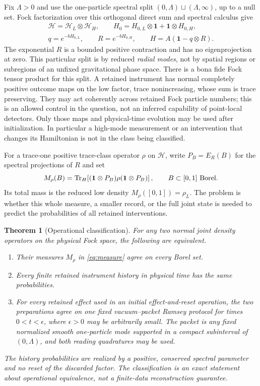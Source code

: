 \documentclass[11pt]{article}
\newtheorem{theorem}{Theorem}
\newcommand{\cH}{\mathcal H}
\newcommand{\tr}{\operatorname{Tr}}
\newcommand{\one}{\mathbf 1}
\begin{document}
Fix \(\Lambda>0\) and use the one-particle spectral split \((0,\Lambda)\sqcup(\Lambda,\infty)\), up to a null set. Fock factorization over this orthogonal direct sum and spectral calculus give
\begin{gather}
  \cH=\cH_L\otimes\cH_H,\qquad
  H_0=H_{0,L}\otimes\one+\one\otimes H_{0,H},\nonumber\\
  q=e^{-bH_{0,L}},\qquad R=e^{-bH_{0,H}},\qquad
  H=A(\one-q\otimes R).
  \label{eq:physical}
\end{gather}
The exponential \(R\) is a bounded positive contraction and has no eigenprojection at zero. This particular split is by reduced \emph{radial modes}, not by spatial regions or subregions of an unfixed gravitational phase space. There is a bona fide Fock tensor product for this split. A retained instrument has normal completely positive outcome maps on the low factor, trace nonincreasing, whose sum is trace preserving. They may act coherently across retained Fock particle numbers; this is an allowed control in the question, not an inferred capability of point-local detectors. Only those maps and physical-time evolution may be used after initialization. In particular a high-mode measurement or an intervention that changes its Hamiltonian is not in the class being classified.

For a trace-one positive trace-class operator \(\rho\) on \(\cH\), write \(P_B=E_R(B)\) for the spectral projections of \(R\) and set
\begin{equation}
 M_\rho(B)=\tr_H\!\left[(\one\otimes P_B)\rho(\one\otimes P_B)\right],
 \qquad B\subset[0,1]\ \hbox{Borel}.
 \label{eq:measure}
\end{equation}
Its total mass is the reduced low density \(M_\rho([0,1])=\rho_L\). The problem is whether this whole measure, a smaller record, or the full joint state is needed to predict the probabilities of all retained interventions.

\begin{theorem}[Operational classification]\label{thm:main}
For any two normal joint density operators on the physical Fock space, the following are equivalent.
\begin{enumerate}
\item Their measures \(M_\rho\) in \eqref{eq:measure} agree on every Borel set.
\item Every finite retained instrument history in physical time has the same probabilities.
\item For every retained effect used in an initial effect-and-reset operation, the two preparations agree on one fixed vacuum--packet Ramsey protocol for times \(0<t<\epsilon\), where \(\epsilon>0\) may be arbitrarily small. The packet is any fixed normalized smooth one-particle mode supported in a compact subinterval of \((0,\Lambda)\), and both reading quadratures may be used.
\end{enumerate}
The history probabilities are realized by a positive, conserved spectral parameter and no reset of the discarded factor. The classification is an exact statement about operational equivalence, not a finite-data reconstruction guarantee.
\end{theorem}
\end{document}
